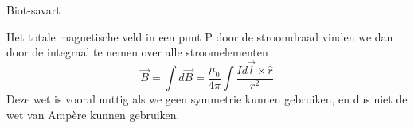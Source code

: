 \begin{lem}{Biot-savart}
\begin{center}
    \end{center}
    Het totale magnetische veld in een punt P door de stroomdraad vinden we dan door de integraal te nemen over alle stroomelementen
    \begin{equation*}
        \Vec{B} = \int d\Vec{B} = \dfrac{\mu_{0}}{4\pi} \int \dfrac{Id\Vec{l} \times \hat{r}}{r^{2}}
    \end{equation*}
    Deze wet is vooral nuttig als we geen symmetrie kunnen gebruiken, en dus niet de wet van Ampère kunnen gebruiken. 
\end{lem}


\newpage

    

